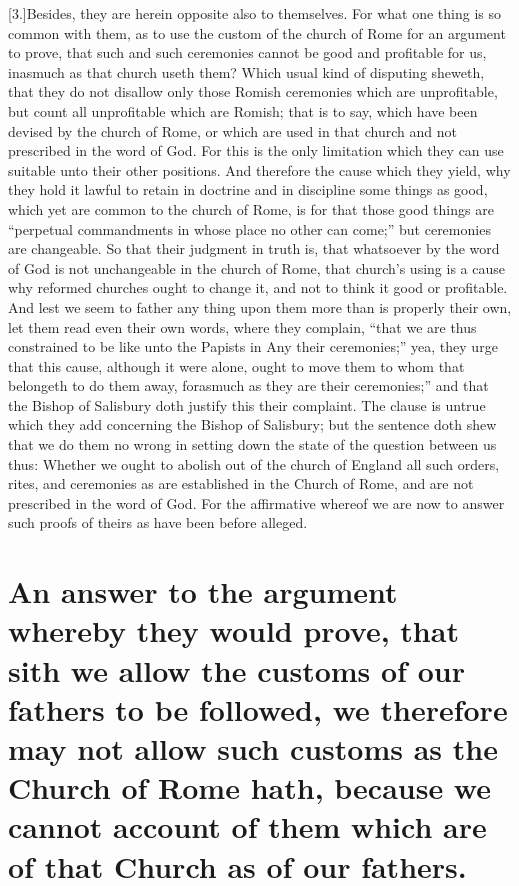 [3.]Besides, they are herein opposite also to themselves. For what one thing is so common with them, as to use the custom of the church of Rome for an argument to prove, that such and such ceremonies cannot be good and profitable for us, inasmuch as that church useth them? Which usual kind of disputing sheweth, that they do not disallow only those Romish ceremonies which are unprofitable, but count all unprofitable which are Romish; that is to say, which have been devised by the church of Rome, or which are used in that church and not prescribed in the word of God. For this is the only limitation which they can use suitable unto their other positions. And therefore the cause which they yield, why they hold it lawful to retain in doctrine and in discipline some things as good, which yet are common to the church of Rome, is for that those good things are “perpetual commandments in whose place no other can come;” but ceremonies are changeable. So that their judgment in truth is, that whatsoever by the word of God is not unchangeable in the church of Rome, that church’s using is a cause why reformed churches ought to change it, and not to think it good or profitable. And lest we seem to father any thing upon them more than is properly their own, let them read even their own words, where they complain, “that we are thus constrained to be like unto the Papists in Any their ceremonies;” yea, they urge that this cause, although it were alone, ought to move them to whom that belongeth to do them away, forasmuch as they are their ceremonies;” and that the Bishop of Salisbury doth justify this their complaint.  The clause is untrue which they add concerning the Bishop of Salisbury; but the sentence doth shew that we do them no wrong in setting down the state of the question between us thus: Whether we ought to abolish out of the church of England all such orders, rites, and ceremonies as are established in the Church of Rome, and are not prescribed in the word of God. For the affirmative whereof we are now to answer such proofs of theirs as have been before alleged.

\section*{An answer to the argument whereby they would prove, that sith we allow the customs of our fathers to be followed, we therefore may not allow such customs as the Church of Rome hath, because we cannot account of them which are of that Church as of our fathers.}

